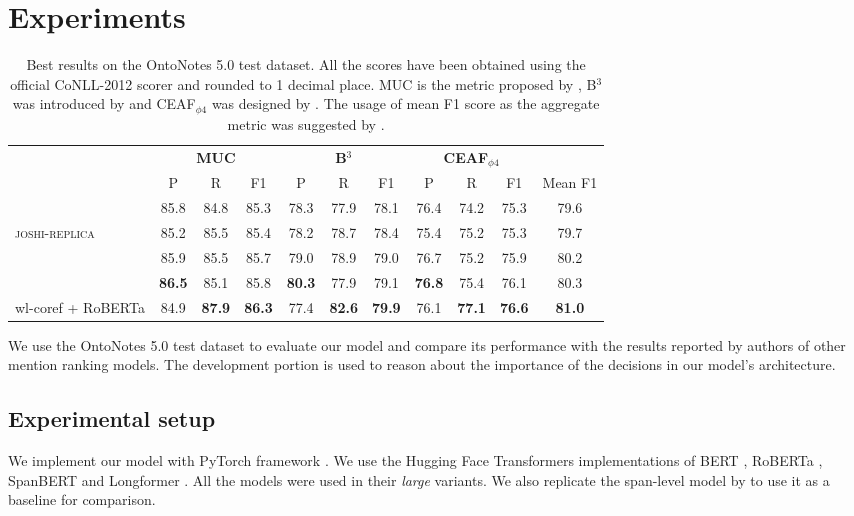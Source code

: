 \documentclass[11pt]{article}
\begin{document}
\section{Experiments}
\begin{table*}
\centering
\begin{tabular}{lcccccccccc}
\hline
& \multicolumn{3}{c}{\textbf{MUC}} & \multicolumn{3}{c}{\textbf{B$^3$}} & \multicolumn{3}{c}{\textbf{CEAF$_{\phi4}$}} & \\
& P & R & F1 & P & R & F1 & P & R & F1 & Mean F1 \\ \hline

\citet{joshi-etal-2020-spanbert} &
85.8 & 84.8 & 85.3 &
78.3 & 77.9 & 78.1 &
76.4 & 74.2 & 75.3 &
79.6 \\

\textsc{joshi-replica} &
85.2 & 85.5 & 85.4 &
78.2 & 78.7 & 78.4 &
75.4 & 75.2 & 75.3 &
79.7 \\

\citet{xu-choi-2020-revealing} &
85.9 & 85.5 & 85.7 &
79.0 & 78.9 & 79.0 &
76.7 & 75.2 & 75.9 &
80.2 \\

\citet{kirstain-etal-2021-no-span} &
\textbf{86.5} & 85.1 & 85.8 &
\textbf{80.3} & 77.9 & 79.1 &
\textbf{76.8} & 75.4 & 76.1 &
80.3 \\

\hline

wl-coref + RoBERTa &
84.9 & \textbf{87.9} & \textbf{86.3} &
77.4 & \textbf{82.6} & \textbf{79.9} &
76.1 & \textbf{77.1} & \textbf{76.6} &
\textbf{81.0} \\

\hline
\end{tabular}
\caption{\label{table_test} Best results on the OntoNotes 5.0 test dataset. All the scores have been obtained using the official CoNLL-2012 scorer \citep{pradhan-etal-2014-scoring} and rounded to 1 decimal place. MUC is the metric proposed by \citet{vilain-etal-1995-model}, B$^3$ was introduced by \citet{Bagga98algorithmsfor} and CEAF$_{\phi4}$ was designed by \citet{luo-2005-coreference}. The usage of mean F1 score as the aggregate metric was suggested by \citet{pradhan-etal-2012-conll}. }
\end{table*} 
We use the OntoNotes 5.0 test dataset to evaluate our model and compare its performance with the results reported by authors of other mention ranking models. The development portion is used to reason about the importance of the decisions in our model's architecture.

\subsection{Experimental setup} We implement our model with PyTorch framework \citep{pytorch}. We use the Hugging Face Transformers \citep{wolf-etal-2020-transformers} implementations of BERT \citep{devlin-etal-2019-bert}, RoBERTa \citep{liu2019roberta}, SpanBERT \citep{joshi-etal-2020-spanbert} and Longformer \citep{longformer}. All the models were used in their \emph{large} variants.
We also replicate the span-level model by \citet{joshi-etal-2020-spanbert} to use it as a baseline for comparison.
\end{document}
